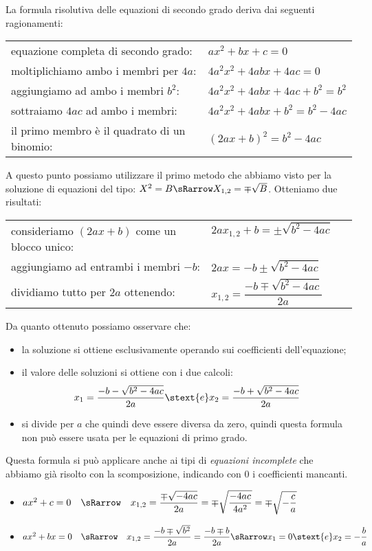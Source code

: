 La formula risolutiva delle equazioni di secondo grado deriva dai seguenti 
ragionamenti:
\begin{center}
\begin{tabular}{ll}
equazione completa di secondo grado: & \(ax^2 +b x +c=0\)\\
moltiplichiamo ambo i membri per \(4a\): & \(4a^2 x^2 +4 a b x +4 a c=0\)\\
aggiungiamo ad ambo i membri \(b^2\): & \(4a^2x^2 +4abx +4ac +b^2=b^2\)\\
sottraiamo \(4ac\) ad ambo i membri: & \(4a^2x^2 +4abx +b^2=b^2 -4ac\)\\
il primo membro è il quadrato di un binomio:~~ & \((2ax +b)^2=b^2 -4ac\)
\end{tabular}
\end{center}
A questo punto possiamo utilizzare il primo metodo che abbiamo visto per la 
soluzione di equazioni del tipo: 
\quad \(X^2=B \sRarrow X_{1,2}=\mp \sqrt{B}\). Otteniamo due risultati:
\begin{center}
\begin{tabular}{ll}
consideriamo \((2ax +b)\) come un blocco unico:~~ & 
    \(2ax_{1,2}+b=\pm \sqrt{b^2 -4ac}\) \quad ~~~\\
aggiungiamo ad entrambi i membri \(-b\): & \(2ax=-b \pm \sqrt{b^2 -4ac}\)\\
dividiamo tutto per \(2a\) ottenendo: & 
    \(x_{1,2} = \dfrac{-b \mp \sqrt{b^2 -4ac}}{2a}\)
\end{tabular}
\end{center}

Da quanto ottenuto possiamo osservare che:
\begin{itemize} [noitemsep]
\item la soluzione si ottiene esclusivamente operando sui coefficienti
dell'equazione;
\item il valore delle soluzioni si ottiene con i due calcoli: 
\[x_1 = \dfrac{-b -\sqrt{b^{2} -4 ac}}{2 a} \stext{e} 
  x_2 = \dfrac{-b +\sqrt{b^{2} -4 ac}}{2 a}\]
\item si divide per \(a\) che quindi deve essere diversa da zero,
quindi questa formula non può essere usata per le equazioni di primo grado.
\end{itemize}

Questa formula si può applicare anche ai tipi di \emph{equazioni incomplete} 
che abbiamo già risolto con la scomposizione, indicando con \(0\) i 
coefficienti mancanti. 

\begin{itemize}
\item \(ax^2 +c=0 \quad \sRarrow \quad 
x_{1,2} = \dfrac{\mp \sqrt{-4ac}}{2a} = 
          \mp \sqrt{\dfrac{-4ac}{4a^2}} = \mp \sqrt{-\dfrac{c}{a}}\)
\item \(ax^2 +b x = 0 \quad \sRarrow \quad 
x_{1,2} = \dfrac{-b \mp \sqrt{b^2}}{2a} = 
          \dfrac{-b \mp b}{2a} \sRarrow 
x_1 = 0 \stext{e} x_2 = -\dfrac{b}{a}\) 
\end{itemize}


